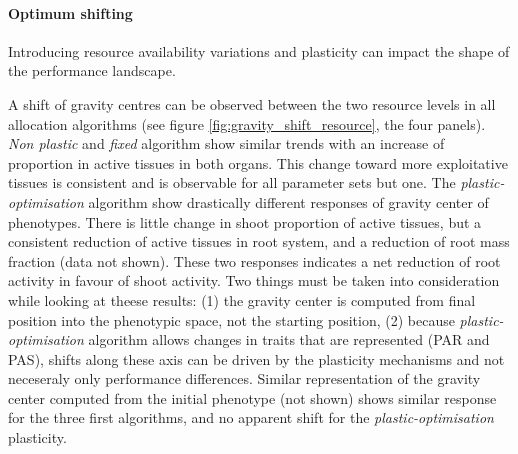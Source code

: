 
\paragraph{Optimum shifting}

Introducing resource availability variations and plasticity can impact the shape of the performance landscape.

A shift of gravity centres can be observed between the two resource levels in all allocation algorithms (see figure \ref{fig:gravity_shift_resource}, the four panels). \textit{Non plastic} and \textit{fixed} algorithm show similar trends with an increase of proportion in active tissues in both organs. This change toward more exploitative tissues is consistent and is observable for all parameter sets but one. The \textit{plastic-optimisation} algorithm show drastically different responses of gravity center of phenotypes. There is little change in shoot proportion of active tissues, but a consistent reduction of active tissues in root system, and a reduction of root mass fraction (data not shown). These two responses indicates a net reduction of root activity in favour of shoot activity. Two things must be taken into consideration while looking at theese results: (1) the gravity center is computed from final position into the phenotypic space, not the starting position, (2) because \textit{plastic-optimisation} algorithm allows changes in traits that are represented (PAR and PAS), shifts along these axis can be driven by the plasticity mechanisms and not neceseraly only performance differences. Similar representation of the gravity center computed from the initial phenotype (not shown) shows similar response for the three first algorithms, and no apparent shift for the \textit{plastic-optimisation} plasticity.

